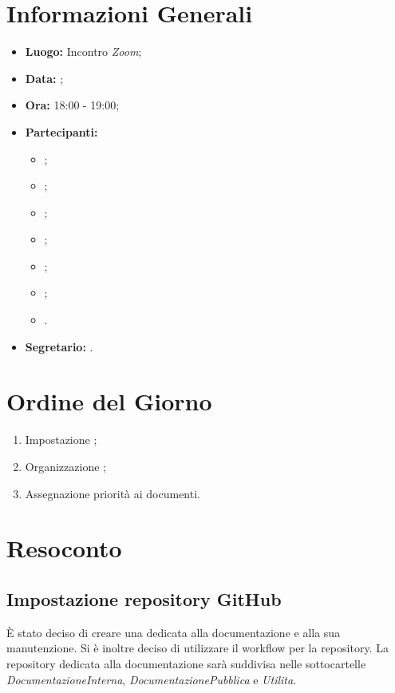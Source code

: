 \section{Informazioni Generali}
\begin{itemize}
\item \textbf{Luogo:} Incontro \textit{Zoom};
\item \textbf{Data:} \Data;
\item \textbf{Ora:} 18:00 - 19:00;
\item \textbf{Partecipanti:}
	\begin{itemize}
		\item \BL{}; 
		\item \FF{};
		\item \MM{}; 
		\item \PC{};
		\item \TG{};
		\item \TL{};
		\item \VD{}.
	\end{itemize} 
\item \textbf{Segretario:} \PC{}.
\end{itemize}

\section{Ordine del Giorno}
\begin{enumerate}
 \item Impostazione  ;
 \item Organizzazione ;
 \item Assegnazione priorità ai documenti.
\end{enumerate}

\section{Resoconto}
\subsection{Impostazione repository GitHub}
È stato deciso di creare una  dedicata alla documentazione e alla sua manutenzione. Si è inoltre deciso di utilizzare il workflow  per la repository. La repository dedicata alla documentazione sarà suddivisa nelle sottocartelle \textit{DocumentazioneInterna}, \textit{DocumentazionePubblica} e \textit{Utilita}.

